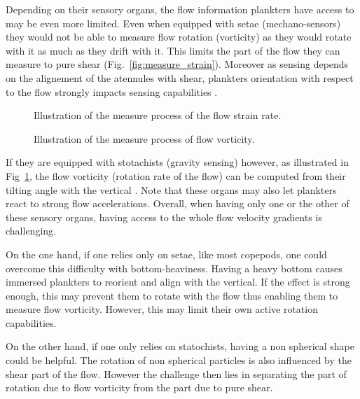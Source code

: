 Depending on their sensory organs, the flow information plankters have access to may be even more limited.
Even when equipped with setae (mechano-sensors) they would not be able to measure flow rotation (vorticity) as they would rotate with it as much as they drift with it.
This limits the part of the flow they can measure to pure shear (Fig.~\ref{fig:measure_strain}).
Moreover as sensing depends on the alignement of the atennules with shear, plankters orientation with respect to the flow strongly impacts sensing capabilities \citep{fields2010orientation}.
\begin{figure}
	\centering
	\begin{minipage}{0.5\textwidth}
	  	\centering
		\def\svgwidth{0.6\textwidth}
		
		\captionsetup{width=0.9\textwidth}
	  	\caption{Illustration of the measure process of the flow strain rate.}
	  	\label{fig:measure_strain}
	\end{minipage}%
	\begin{minipage}{0.5\textwidth}
		\centering
		\def\svgwidth{0.6\textwidth}
		
		\captionsetup{width=0.9\textwidth}
	  	\caption{Illustration of the measure process of flow vorticity.}
	  	\label{fig:measure_vorticity}
	\end{minipage}
\end{figure}
If they are equipped with stotachists (gravity sensing) however, as illustrated in Fig~\ref{fig:measure_vorticity}, the flow vorticity (rotation rate of the flow) can be computed from their tilting angle with the vertical \citep{fuchs2015directional}.
Note that these organs may also let plankters react to strong flow accelerations.
Overall, when having only one or the other of these sensory organs, having access to the whole flow velocity gradients is challenging.

On the one hand, if one relies only on setae, like most copepods, one could overcome this difficulty with bottom-heaviness.
Having a heavy bottom causes immersed plankters to reorient and align with the vertical.
If the effect is strong enough, this may prevent them to rotate with the flow thus enabling them to measure flow vorticity.
However, this may limit their own active rotation capabilities.

On the other hand, if one only relies on statochists, having a non spherical shape could be helpful.
The rotation of non spherical particles is also influenced by the shear part of the flow.
However the challenge then lies in separating the part of rotation due to flow vorticity from the part due to pure shear.

